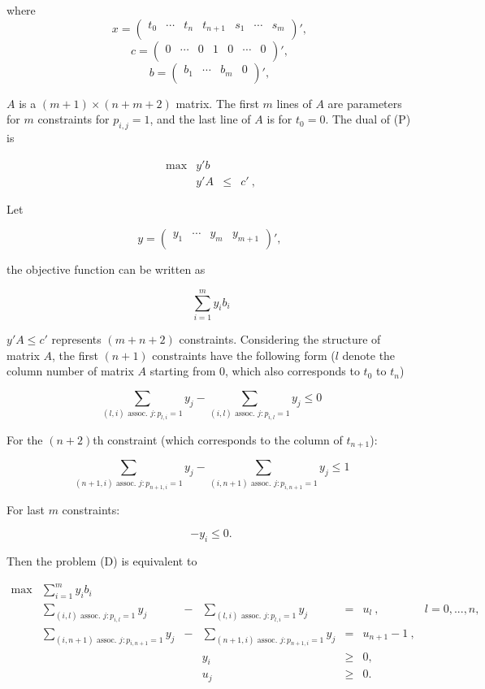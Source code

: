 where $$x = \left(
  \begin{array}{ccccccc}
    t_0 & \cdots & t_n & t_{n+1} & s_1 & \cdots & s_m \\
  \end{array}
\right)',~$$ $$c = \left(
  \begin{array}{ccccccc}
    0 & \cdots & 0 & 1 & 0 & \cdots & 0 \\
  \end{array}
\right)',~
$$ $$
b = \left(
  \begin{array}{cccc}
    b_1 & \cdots & b_m & 0 \\
  \end{array}
\right)',~
$$

$A$ is a $(m+1)\times (n+m+2)$ matrix. The first $m$ lines of $A$ are parameters for $m$ constraints for $p_{i,j} = 1$, and the last line of $A$ is for $t_0=0$. The dual of (P) is

\[
\begin{array}{rrcl}
 \max & y'b  &      &   \\
      &  y'A  &   \leq  & c'~,
\end{array}
\tag{D}
\]

Let

$$
y = \left(
  \begin{array}{cccc}
    y_1 & \cdots & y_m & y_{m+1} \\
  \end{array}
\right)',~
$$

the objective function can be written as

$$ \sum_{i=1}^m y_i b_i $$

$y'A \leq c'$ represents $(m+n+2)$ constraints. Considering the structure of matrix $A$, the first $(n+1)$ constraints have the following form ($l$ denote the column number of matrix $A$ starting from 0, which also corresponds to $t_0$ to $t_n$)

$$ \sum_{(l,i) \text{ assoc. } j:p_{l,i}=1} y_j - \sum_{(i,l) \text{ assoc. } j:p_{i,l}=1} y_j \leq 0 $$

For the $(n+2)$th constraint (which corresponds to the column of $t_{n+1}$):

$$ \sum_{(n+1,i) \text{ assoc. } j:p_{n+1,i}=1} y_j - \sum_{(i,n+1) \text{ assoc. } j:p_{i,n+1}=1} y_j \leq 1 $$

For last $m$ constraints:

$$-y_i \leq 0. $$

Then the problem (D) is equivalent to 

\[
\begin{array}{rlcrcll}
 \max & \sum_{i=1}^m y_i b_i  &  &&    & &  \\
      &  \sum_{(i,l)\text{ assoc. } j:p_{i,l}=1} y_j  & - & \sum_{(l,i) \text{ assoc. } j:p_{l,i}=1} y_j &  =  & u_l ~,& l=0,...,n,\\
      &  \sum_{(i,n+1) \text{ assoc. } j:p_{i,n+1}=1} y_j & - & \sum_{(n+1,i) \text{ assoc. } j:p_{n+1,i}=1} y_j & = & u_{n+1}-1~,&\\
	&&& y_i & \geq & 0, & \\
	&&& u_j & \geq & 0. & 
\end{array}
\tag{D'}
\]

